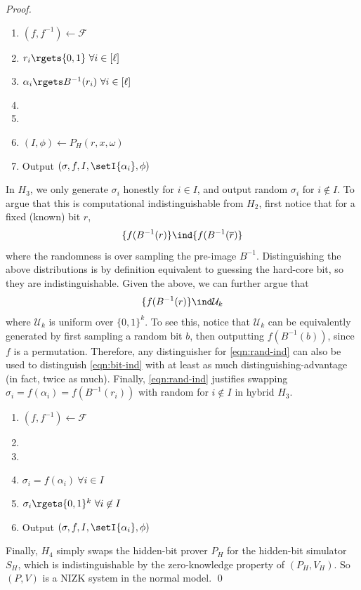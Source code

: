 \begin{proof}
\begin{enumerate}
    \item $(f, f^{-1}) \gets \mathcal{F}$
    \item $r_i \rgets \{0, 1\} ~\forall i \in [\ell]$
    \item $\alpha_i \rgets B^{-1}(r_i) ~\forall i \in [\ell]$
    \item {}
    \item {}
    \item $(I, \phi) \gets P_H(r, x, \omega)$
    \item Output $(\sigma, f, I, \setI{\alpha_i}, \phi)$
\end{enumerate}
In $H_3$, we only generate $\sigma_i$ honestly for $i \in I$, and output random
$\sigma_i$ for $i \not\in I$.
To argue that this is computational
indistinguishable from $H_2$, first notice that for a fixed (known) bit $r$,
\begin{equation}
\label{eqn:bit-ind}
\{f(B^{-1}(r)\} \ind \{f(B^{-1}(\overline r)\}
\end{equation}
where the randomness is over sampling the pre-image $B^{-1}$.
Distinguishing the above distributions is by definition equivalent to guessing the
hard-core bit, so they are indistinguishable.
Given the above, we can further argue that
\begin{equation}
\label{eqn:rand-ind}
\{f(B^{-1}(r)\} \ind \mathcal{U}_k
\end{equation}
where $\mathcal{U}_k$ is uniform over $\{0, 1\}^k$. To see this, notice
that $\mathcal{U}_k$ can be equivalently generated by first sampling a random
bit $b$, then outputting $f(B^{-1}(b))$, since $f$ is a permutation.
Therefore, any distinguisher for \eqref{eqn:rand-ind} can also be used to distinguish
\eqref{eqn:bit-ind} with at least as much distinguishing-advantage (in fact,
twice as much).
Finally, \eqref{eqn:rand-ind} justifies swapping $\sigma_i = f(\alpha_i) =
f(B^{-1}(r_i))$ with random for $i \not\in I$ in hybrid $H_3$.





\begin{enumerate}
    \item $(f, f^{-1}) \gets \mathcal{F}$
    \item {}
    \item {}
    \item $\sigma_i = f(\alpha_i) ~\forall i \in I$
    \item $\sigma_i \rgets \{0, 1\}^k ~\forall i \not\in I$
    \item Output $(\sigma, f, I, \setI{\alpha_i}, \phi)$
\end{enumerate}
Finally, $H_4$ simply swaps the hidden-bit prover $P_H$ for the hidden-bit simulator $S_H$,
which is indistinguishable by the zero-knowledge property of $(P_H, V_H)$.
So $(P, V)$ is a NIZK system in the normal model.
\qed

\end{proof}



